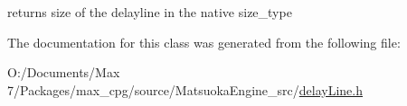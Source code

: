 returns size of the delayline in the native size\+\_\+type 



The documentation for this class was generated from the following file\+:\begin{DoxyCompactItemize}
\item 
O\+:/\+Documents/\+Max 7/\+Packages/max\+\_\+cpg/source/\+Matsuoka\+Engine\+\_\+src/\mbox{\hyperlink{delayLine_8h}{delay\+Line.\+h}}\end{DoxyCompactItemize}
